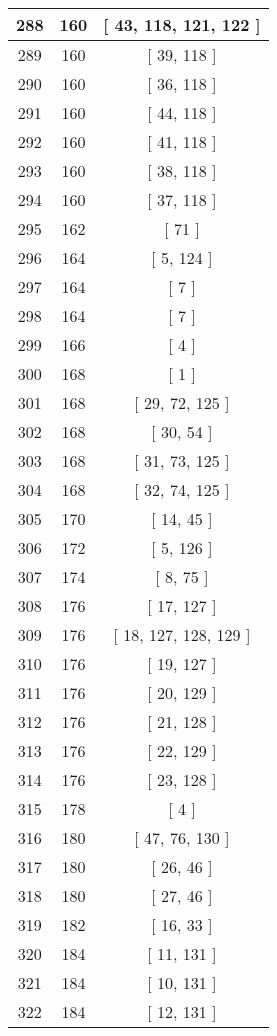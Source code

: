 \begin{center}
\begin{longtable}[H]{|| c c c ||}
\hline
288 & 160 & [ 43, 118, 121, 122 ] \\ 
\hline
289 & 160 & [ 39, 118 ] \\ 
\hline
290 & 160 & [ 36, 118 ] \\ 
\hline
291 & 160 & [ 44, 118 ] \\ 
\hline
292 & 160 & [ 41, 118 ] \\ 
\hline
293 & 160 & [ 38, 118 ] \\ 
\hline
294 & 160 & [ 37, 118 ] \\ 
\hline
295 & 162 & [ 71 ] \\ 
\hline
296 & 164 & [ 5, 124 ] \\ 
\hline
297 & 164 & [ 7 ] \\ 
\hline
298 & 164 & [ 7 ] \\ 
\hline
299 & 166 & [ 4 ] \\ 
\hline
300 & 168 & [ 1 ] \\ 
\hline
301 & 168 & [ 29, 72, 125 ] \\ 
\hline
302 & 168 & [ 30, 54 ] \\ 
\hline
303 & 168 & [ 31, 73, 125 ] \\ 
\hline
304 & 168 & [ 32, 74, 125 ] \\ 
\hline
305 & 170 & [ 14, 45 ] \\ 
\hline
306 & 172 & [ 5, 126 ] \\ 
\hline
307 & 174 & [ 8, 75 ] \\ 
\hline
308 & 176 & [ 17, 127 ] \\ 
\hline
309 & 176 & [ 18, 127, 128, 129 ] \\ 
\hline
310 & 176 & [ 19, 127 ] \\ 
\hline
311 & 176 & [ 20, 129 ] \\ 
\hline
312 & 176 & [ 21, 128 ] \\ 
\hline
313 & 176 & [ 22, 129 ] \\ 
\hline
314 & 176 & [ 23, 128 ] \\ 
\hline
315 & 178 & [ 4 ] \\ 
\hline
316 & 180 & [ 47, 76, 130 ] \\ 
\hline
317 & 180 & [ 26, 46 ] \\ 
\hline
318 & 180 & [ 27, 46 ] \\ 
\hline
319 & 182 & [ 16, 33 ] \\ 
\hline
320 & 184 & [ 11, 131 ] \\ 
\hline
321 & 184 & [ 10, 131 ] \\ 
\hline
322 & 184 & [ 12, 131 ] \\ 

\end{longtable}
\end{center}
